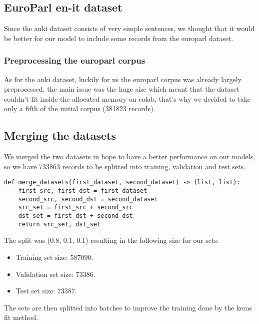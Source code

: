 \subsection{EuroParl en-it dataset}
Since the anki dataset consists of very simple sentences, we thought that it would be better for our model to include some records from the europarl dataset.
\subsubsection{Preprocessing the europarl corpus}
As for the anki dataset, luckily for us the europarl corpus was already largely preprocessed, the main issue was the huge size which meant that the dataset couldn't fit inside the allocated memory on colab, that's why we decided to take only a fifth of the initial corpus (381823 records).
\begin{comment}
\begin{verbatim}
def create_dataset_euparl(name: str, src: str = "en", dst: str = "it",
                        size: float = 1) -> (list, list):
    with open(name+".{0}".format(src), encoding="UTF-8") as datafile:
        src_set = datafile.readlines()

    with open(name+".{0}".format(dst), encoding="UTF-8") as datafile:
        dst_set = datafile.readlines()

    if size != 1:
        if size > 1 or size < 0:
            raise ValueError("No correct size for the euparl corpus")
        
        datasets_to_shuffle = list((zip(src_set, dst_set)))
        np.random.shuffle(datasets_to_shuffle)
        src_set, dst_set = zip(*datasets_to_shuffle)
        src_set = list(src_set[:int(len(src_set) * size)])
        dst_set = list(dst_set[:int(len(dst_set) * size)])
        
    return src_set, dst_set
\end{verbatim}
\end{comment}
\subsection{Merging the datasets}
We merged the two datasets in hope to have a better performance on our models, so we have 733863 records to be splitted into training, validation and test sets.
\begin{verbatim}
def merge_datasets(first_dataset, second_dataset) -> (list, list):
    first_src, first_dst = first_dataset
    second_src, second_dst = second_dataset
    src_set = first_src + second_src
    dst_set = first_dst + second_dst
    return src_set, dst_set
\end{verbatim}
The split was (0.8, 0.1, 0.1) resulting in the following size for our sets:
\begin{itemize}
    \item Training set size: 587090.
    \item Validation set size: 73386.
    \item Test set size: 73387.
\end{itemize}
The sets are then splitted into batches to improve the training done by the keras fit method.

